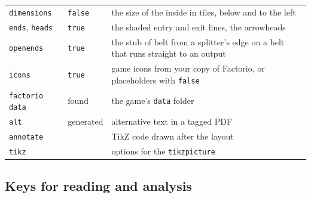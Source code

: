 \documentclass[11pt]{article}
\newcommand\key[1]{\texttt{#1}}
\begin{document}
\begin{tabularx}{\linewidth}{@{}l l X@{}}
		\key{dimensions} & \key{false} & the size of the inside in tiles, below and to the left \\
		\key{ends}, \key{heads} & \key{true} & the shaded entry and exit lines, the arrowheads \\
		\key{openends} & \key{true} & the stub of belt from a splitter's edge on a belt that runs straight to an output \\
		\key{icons} & \key{true} & game icons from your copy of Factorio, or placeholders with \key{false} \\
		\key{factorio data} & found & the game's \texttt{data} folder \\
		\key{alt} & generated & alternative text in a tagged PDF \\
		\key{annotate} & & TikZ code drawn after the layout \\
		\key{tikz} & & options for the \texttt{tikzpicture} \\
		\bottomrule
	\end{tabularx}

	\subsection{Keys for reading and analysis}
\end{document}

